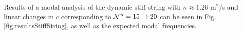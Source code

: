 \documentclass[fleqn]{jaes}
\begin{document}
Results of a modal analysis of the dynamic stiff string with $\kappa \approx 1.26$ m$^2$/s and linear changes in $c$ corresponding to $\mathcal{N}^n = 15 \rightarrow 20$ can be seen in Fig. \ref{fig:resultsStiffString}, as well as the expected modal frequencies. 
%
%
\end{document}
